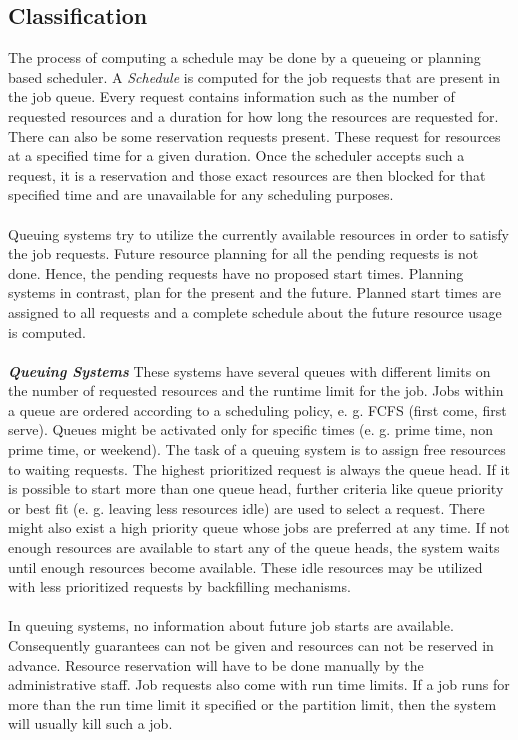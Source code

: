\subsection{Classification}
The process of computing a schedule may be done by a queueing or planning based scheduler. A \textit{Schedule} is computed for the job requests that are present in the job queue. Every request contains information such as the number of requested resources and a duration for how long the resources are requested for. There can also be some reservation requests present. These request for resources at a specified time for a given duration. Once the scheduler accepts such a request, it is a reservation and those exact resources are then blocked for that specified time and are unavailable for any scheduling purposes.\\ \\
Queuing systems try to utilize the currently available resources in order to satisfy the job requests. Future resource planning for all the pending requests is not done. Hence, the pending requests have no proposed start times. Planning systems in contrast, plan for the present and the future. Planned start times are assigned to all requests and a complete schedule about the future resource usage is computed.\\ \\
\textbf{\textit{Queuing Systems }} These systems have several queues with different limits on the number of requested resources and the runtime limit for the job. Jobs within a queue are ordered according to a scheduling policy, e. g. FCFS (first come, first serve). Queues might be activated only for specific times (e. g. prime time, non prime time, or weekend). The task of a queuing system is to assign free resources to waiting requests. The highest prioritized request is always the queue head. If it is possible to start more than one queue head, further criteria like queue priority or best fit (e. g. leaving less resources idle) are used to select a request. There might also exist a high priority queue whose jobs are preferred at any time. If not enough resources are available to start any of the queue heads, the system waits until enough resources become available. These idle resources may be utilized with less prioritized requests by backfilling mechanisms.\\ \\
In queuing systems, no information about future job starts are available. Consequently guarantees can not be given and resources can not be reserved in advance. Resource reservation will have to be done manually by the administrative staff. Job requests also come with run time limits. If a job runs for more than the run time limit it specified or the partition limit, then the system will usually kill such a job.\\ \\
